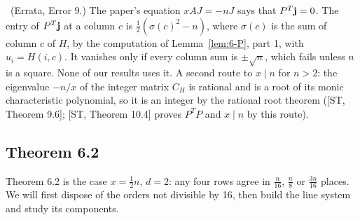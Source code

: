 \begin{remark}
\repair\ (Errata, Error 9.) The paper's equation $xAJ=-nJ$ says that $P^T{\mathbf j}=0$. The entry of
$P^T{\mathbf j}$ at a column $c$ is $\frac12(\sigma(c)^2-n)$, where $\sigma(c)$ is the sum of column $c$
of $H$, by the computation of Lemma~\ref{lem:6-P}, part 1, with $u_i=H(i,c)$. It vanishes only
if every column sum is $\pm\sqrt n$, which fails unless $n$ is a square. None of our results uses
it. A second route to $x\mid n$ for $n>2$: the eigenvalue $-n/x$ of the integer matrix $C_H$ is
rational and is a root of its monic characteristic polynomial, so it is an integer by the
rational root theorem ([ST, Theorem 9.6]; [ST, Theorem 10.4] proves $P^TP$ and $x\mid n$ by this
route).
\end{remark}

\subsection{Theorem 6.2}

Theorem 6.2 is the case $x=\frac12n$, $d=2$: any four rows agree in $\frac n{16}$, $\frac n8$ or
$\frac{3n}{16}$ places. We will first dispose of the orders not divisible by 16, then build the
line system and study its components.

